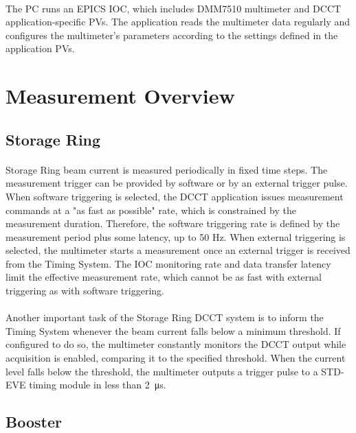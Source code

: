 \documentclass[openany]{article}
\begin{document}
	\paragraph{} The PC runs an EPICS IOC, which includes DMM7510 multimeter and DCCT application-specific PVs. The application reads the multimeter data regularly and configures the multimeter's parameters according to the settings defined in the application PVs.

\section{Measurement Overview}

	\subsection{Storage Ring} 

		\paragraph{} Storage Ring beam current is measured periodically in fixed time steps. The measurement trigger can be provided by software or by an external trigger pulse. When software triggering is selected, the DCCT application issues measurement commands at a "as fast as possible" rate, which is constrained by the measurement duration. Therefore, the software triggering rate is defined by the measurement period plus some latency, up to 50 Hz. When external triggering is selected, the multimeter starts a measurement once an external trigger is received from the Timing System. The IOC monitoring rate and data transfer latency limit the effective measurement rate, which cannot be as fast with external triggering as with software triggering.

		\paragraph{} Another important task of the Storage Ring DCCT system is to inform the Timing System whenever the beam current falls below a minimum threshold. If configured to do so, the multimeter constantly monitors the DCCT output while acquisition is enabled, comparing it to the specified threshold. When the current level falls below the threshold, the multimeter outputs a trigger pulse to a STD-EVE timing module in less than \SI{2}{\micro\second}.

	\subsection{Booster} 
\end{document}
